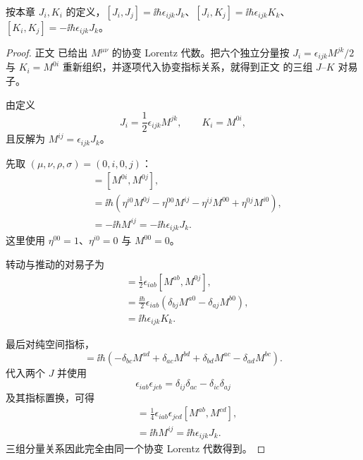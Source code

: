\begin{corollary}
按本章 $J_i,K_i$ 的定义，$[J_i,J_j]=\ii\hbar\epsilon_{ijk}J_k$、$[J_i,K_j]=\ii\hbar\epsilon_{ijk}K_k$、$[K_i,K_j]=-\ii\hbar\epsilon_{ijk}J_k$。
\end{corollary}

\begin{proof}
正文 已给出 $M^{\mu\nu}$ 的协变 Lorentz 代数。把六个独立分量按 $J_i=\epsilon_{ijk}M^{jk}/2$ 与 $K_i=M^{0i}$ 重新组织，并逐项代入协变指标关系，就得到正文 的三组 $J$--$K$ 对易子。


由定义
\begin{equation*}
 J_i=\frac12\epsilon_{ijk}M^{jk},
 \qquad K_i=M^{0i},
\end{equation*}
且反解为 $M^{ij}=\epsilon_{ijk}J_k$。

先取 $(\mu,\nu,\rho,\sigma)=(0,i,0,j)$：
\begin{align*}
 [K_i,K_j]
 &=[M^{0i},M^{0j}],\\
 &=\ii\hbar\left(
 \eta^{i0}M^{0j}-\eta^{00}M^{ij}
 -\eta^{ij}M^{00}+\eta^{0j}M^{i0}\right),\\
 &=-\ii\hbar M^{ij}
 =-\ii\hbar\epsilon_{ijk}J_k.
\end{align*}
这里使用 $\eta^{00}=1$、$\eta^{i0}=0$ 与 $M^{00}=0$。

转动与推动的对易子为
\begin{align*}
 [J_i,K_j]
 &=\frac12\epsilon_{iab}[M^{ab},M^{0j}],\\
 &=\frac{\ii\hbar}{2}\epsilon_{iab}
 (\delta_{bj}M^{a0}-\delta_{aj}M^{b0}),\\
 &=\ii\hbar\epsilon_{ijk}K_k.
\end{align*}

最后对纯空间指标，
\begin{equation*}
 [M^{ab},M^{cd}]
 =\ii\hbar(-\delta_{bc}M^{ad}+\delta_{ac}M^{bd}
 +\delta_{bd}M^{ac}-\delta_{ad}M^{bc}).
\end{equation*}
代入两个 $J$ 并使用
\begin{equation*}
 \epsilon_{iab}\epsilon_{jcb}
 =\delta_{ij}\delta_{ac}-\delta_{ic}\delta_{aj}
\end{equation*}
及其指标置换，可得
\begin{align*}
 [J_i,J_j]
 &=\frac14\epsilon_{iab}\epsilon_{jcd}[M^{ab},M^{cd}],\\
 &=\ii\hbar M^{ij}
 =\ii\hbar\epsilon_{ijk}J_k.
\end{align*}
三组分量关系因此完全由同一个协变 Lorentz 代数得到。
\end{proof}

